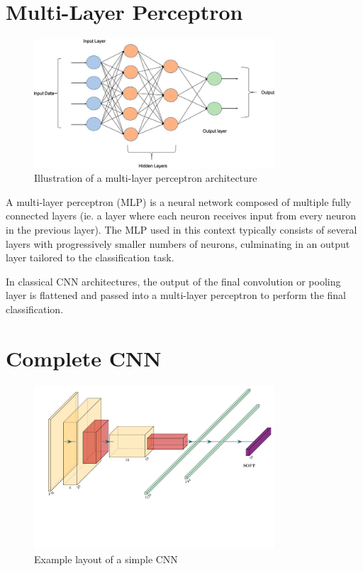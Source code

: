 \documentclass{pracalicmgr}
\begin{document}
\section{Multi-Layer Perceptron}

\begin{figure}[H]
\centering
\includegraphics[width=0.8\textwidth]{src/mlp.jpg}
\caption{Illustration of a multi-layer perceptron architecture}
\end{figure}

A multi-layer perceptron (MLP) is a neural network composed of multiple fully connected layers (ie. a layer where each neuron receives input from every neuron in the previous layer). The MLP used in this context typically consists of several layers with progressively smaller numbers of neurons, culminating in an output layer tailored to the classification task.

In classical CNN architectures, the output of the final convolution or pooling layer is flattened and passed into a multi-layer perceptron to perform the final classification.

\section{Complete CNN}

\begin{figure}[H]
    \centering
    \includegraphics[width=0.8\textwidth]{src/lenet.pdf}
    \caption{Example layout of a simple CNN}
\end{figure}
\end{document}
